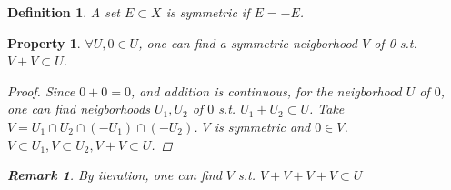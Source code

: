 \documentclass{article}
\newtheorem*{property}{Property}
\newtheorem*{definition}{Definition}
\newtheorem*{remark}{Remark}
\begin{document}
\begin{definition}
  A set $E \subset X$ is symmetric if $E = -E$.
\end{definition}
\begin{property}
  $\forall U, 0 \in U$, one can find a symmetric neigborhood $V$ of 0 s.t.
  $V + V \subset U$.
  \begin{proof}
    Since $0 + 0 = 0$, and addition is continuous, 
    for the neigborhood $U$ of $0$, one can find neigborhoods $U_1, U_2$
    of $0$ s.t. $U_1 + U_2 \subset U$. 
    Take $V = U_1 \cap U_2 \cap (-U_1) \cap (-U_2)$. 
    $V$ is symmetric and $0 \in V$. 
    $V \subset U_1, V \subset U_2, V + V \subset U$.
  \end{proof}
  \begin{remark}
    By iteration, one can find $V$ s.t. 
    $V + V + V + V \subset U$
  \end{remark}
\end{property}
\end{document}
